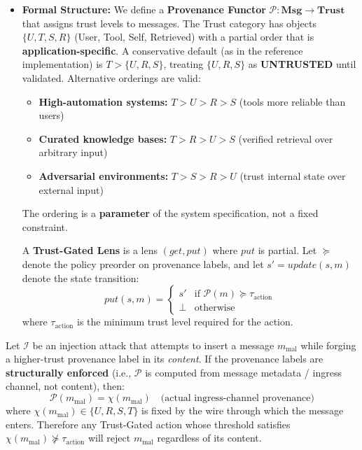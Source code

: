\begin{itemize}[leftmargin=*]
\item \textbf{Formal Structure:} We define a \textbf{Provenance Functor} $\mathcal{P}: \mathbf{Msg} \to \mathbf{Trust}$ that assigns trust levels to messages. The Trust category has objects $\{U, T, S, R\}$ (User, Tool, Self, Retrieved) with a partial order that is \textbf{application-specific}. A conservative default (as in the reference implementation) is $T > \{U,R,S\}$, treating $\{U,R,S\}$ as \textbf{UNTRUSTED} until validated. Alternative orderings are valid:
\begin{itemize}
\item \textbf{High-automation systems:} $T > U > R > S$ (tools more reliable than users)
\item \textbf{Curated knowledge bases:} $T > R > U > S$ (verified retrieval over arbitrary input)
\item \textbf{Adversarial environments:} $T > S > R > U$ (trust internal state over external input)
\end{itemize}
The ordering is a \textbf{parameter} of the system specification, not a fixed constraint.

A \textbf{Trust-Gated Lens} is a lens $(get, put)$ where $put$ is partial. Let $\succeq$ denote the policy preorder on provenance labels, and let $s' = update(s, m)$ denote the state transition:
\begin{equation}
put(s, m) =
\begin{cases}
s' & \text{if } \mathcal{P}(m) \succeq \tau_{\text{action}} \\
\bot & \text{otherwise}
\end{cases}
\label{eq:trust-gated-lens}
\end{equation}
where $\tau_{\text{action}}$ is the minimum trust level required for the action.
\end{itemize}

\begin{theorem}\label{thm:injection-resistance}
Let $\mathcal{I}$ be an injection attack that attempts to insert a message $m_{\text{mal}}$ while forging a higher-trust provenance label in its \emph{content}. If the provenance labels are \textbf{structurally enforced} (i.e., $\mathcal{P}$ is computed from message metadata / ingress channel, not content), then:
\[
\mathcal{P}(m_{\text{mal}}) = \chi(m_{\text{mal}}) \quad \text{(actual ingress-channel provenance)}
\]
where $\chi(m_{\text{mal}}) \in \{U, R, S, T\}$ is fixed by the wire through which the message enters. Therefore any Trust-Gated action whose threshold satisfies $\chi(m_{\text{mal}}) \nsucceq \tau_{\text{action}}$ will reject $m_{\text{mal}}$ regardless of its content.
\end{theorem}

